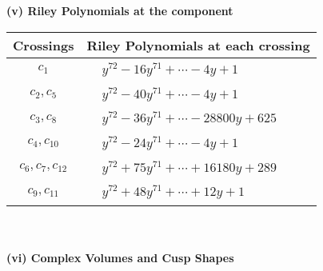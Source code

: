 \documentclass[1p]{elsarticle_modified}
\theoremstyle{definition}
\begin{document}
\newpage\renewcommand{\arraystretch}{1}
\flushleft \textbf{(v) Riley Polynomials at the component}\newline \\
\begin{tabular}{m{50pt}|m{274pt}}
Crossings & \hspace{64pt}Riley Polynomials at each crossing \\
\hline $$\begin{aligned}c_{1}\end{aligned}$$&$\begin{aligned}
&y^{72}-16 y^{71}+\cdots-4 y+1
\end{aligned}$\\
\hline $$\begin{aligned}c_{2},c_{5}\end{aligned}$$&$\begin{aligned}
&y^{72}-40 y^{71}+\cdots-4 y+1
\end{aligned}$\\
\hline $$\begin{aligned}c_{3},c_{8}\end{aligned}$$&$\begin{aligned}
&y^{72}-36 y^{71}+\cdots-28800 y+625
\end{aligned}$\\
\hline $$\begin{aligned}c_{4},c_{10}\end{aligned}$$&$\begin{aligned}
&y^{72}-24 y^{71}+\cdots-4 y+1
\end{aligned}$\\
\hline $$\begin{aligned}c_{6},c_{7},c_{12}\end{aligned}$$&$\begin{aligned}
&y^{72}+75 y^{71}+\cdots+16180 y+289
\end{aligned}$\\
\hline $$\begin{aligned}c_{9},c_{11}\end{aligned}$$&$\begin{aligned}
&y^{72}+48 y^{71}+\cdots+12 y+1
\end{aligned}$\\
\hline
\end{tabular}\\~\\
\newpage\flushleft \textbf{(vi) Complex Volumes and Cusp Shapes}
\end{document}
